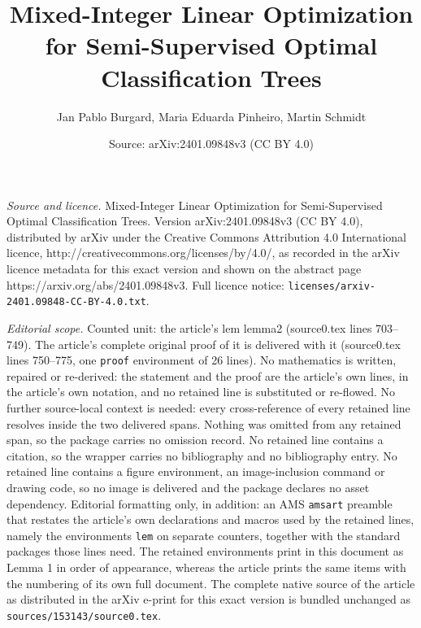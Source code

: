\documentclass[10pt,a4paper]{amsart}
\title{Mixed-Integer Linear Optimization for Semi-Supervised Optimal Classification Trees}
\author{Jan Pablo Burgard, Maria Eduarda Pinheiro, Martin Schmidt}
\date{Source: arXiv:2401.09848v3 (CC BY 4.0)}
\begin{document}
\maketitle

\noindent\emph{Source and licence.} Mixed-Integer Linear Optimization for Semi-Supervised Optimal Classification Trees. Version arXiv:2401.09848v3 (CC BY 4.0), distributed by arXiv under the Creative Commons Attribution 4.0 International licence, http://creativecommons.org/licenses/by/4.0/, as recorded in the arXiv licence metadata for this exact version and shown on the abstract page https://arxiv.org/abs/2401.09848v3. Full licence notice: \texttt{licenses/arxiv-2401.09848-CC-BY-4.0.txt}.\par\smallskip

\noindent\textit{Editorial scope.} Counted unit: the article's lem lemma2 (source0.tex lines 703--749). The article's complete original proof of it is delivered with it (source0.tex lines 750--775, one \texttt{proof} environment of 26 lines). No mathematics is written, repaired or re-derived: the statement and the proof are the article's own lines, in the article's own notation, and no retained line is substituted or re-flowed.  No further source-local context is needed: every cross-reference of every retained line resolves inside the two delivered spans.  Nothing was omitted from any retained span, so the package carries no omission record.  No retained line contains a citation, so the wrapper carries no bibliography and no bibliography entry.  No retained line contains a figure environment, an image-inclusion command or drawing code, so no image is delivered and the package declares no asset dependency.  Editorial formatting only, in addition: an AMS \texttt{amsart} preamble that restates the article's own declarations and macros used by the retained lines, namely the environments \texttt{lem} on separate counters, together with the standard packages those lines need.  The retained environments print in this document as Lemma 1 in order of appearance, whereas the article prints the same items with the numbering of its own full document.  The complete native source of the article as distributed in the arXiv e-print for this exact version is bundled unchanged as \texttt{sources/153143/source0.tex}.
\end{document}
